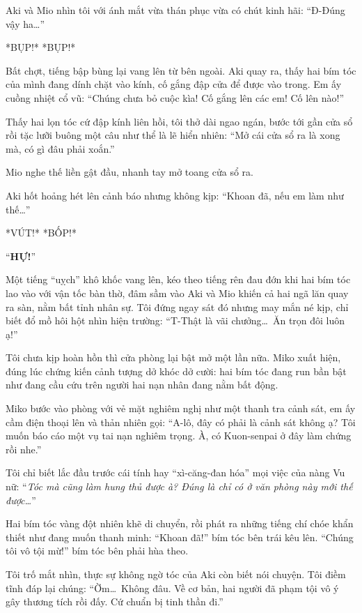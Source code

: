 \documentclass[../main.tex]{subfiles}
\begin{document}
Aki và Mio nhìn tôi với ánh mắt vừa thán phục vừa có chút kinh hãi: ``Đ-Đúng vậy ha\dots''

*BỤP!* *BỤP!*

Bất chợt, tiếng bập bùng lại vang lên từ bên ngoài. Aki quay ra, thấy hai bím tóc của mình đang dính chặt vào kính, cố gắng đập cửa để được vào trong. Em ấy cuồng nhiệt cổ vũ: ``Chúng chưa bỏ cuộc kìa! Cố gắng lên các em! Cố lên nào!''


Thấy hai lọn tóc cứ đập kính liên hồi, tôi thở dài ngao ngán, bước tới gần cửa sổ rồi tặc lưỡi buông một câu như thể là lẽ hiển nhiên: ``Mở cái cửa sổ ra là xong mà, có gì đâu phải xoắn.''

Mio nghe thế liền gật đầu, nhanh tay mở toang cửa sổ ra.

Aki hốt hoảng hét lên cảnh báo nhưng không kịp: ``Khoan đã, nếu em làm như thế\dots''

*VÚT!* *BỐP!*

``\textbf{HỰ!}''


Một tiếng ``uỵch'' khô khốc vang lên, kéo theo tiếng rên đau đớn khi hai bím tóc lao vào với vận tốc bàn thờ, đâm sầm vào Aki và Mio khiến cả hai ngã lăn quay ra sàn, nằm bất tỉnh nhân sự. Tôi đứng ngay sát đó nhưng may mắn né kịp, chỉ biết đổ mồ hôi hột nhìn hiện trường: ``T-Thật là vãi chưởng\dots\ Ăn trọn đôi luôn ạ!''

Tôi chưa kịp hoàn hồn thì cửa phòng lại bật mở một lần nữa. Miko xuất hiện, đúng lúc chứng kiến cảnh tượng dở khóc dở cười: hai bím tóc đang run bần bật như đang cầu cứu trên người hai nạn nhân đang nằm bất động.


Miko bước vào phòng với vẻ mặt nghiêm nghị như một thanh tra cảnh sát, em ấy cầm điện thoại lên và thản nhiên gọi: ``A-lô, đây có phải là cảnh sát không ạ? Tôi muốn báo cáo một vụ tai nạn nghiêm trọng. À, có Kuon-senpai ở đây làm chứng rồi nhe.''

Tôi chỉ biết lắc đầu trước cái tính hay ``xì-căng-đan hóa'' mọi việc của nàng Vu nữ: ``\textit{Tóc mà cũng làm hung thủ được à? Đúng là chỉ có ở văn phòng này mới thế được\dots}''

Hai bím tóc vàng đột nhiên khẽ di chuyển, rồi phát ra những tiếng chí chóe khẩn thiết như đang muốn thanh minh:
``Khoan đã!'' bím tóc bên trái kêu lên.
``Chúng tôi vô tội mừ!'' bím tóc bên phải hùa theo.

Tôi trố mắt nhìn, thực sự không ngờ tóc của Aki còn biết nói chuyện. Tôi điềm tĩnh đáp lại chúng: ``Ờm\dots\ Không đâu. Về cơ bản, hai người đã phạm tội vô ý gây thương tích rồi đấy. Cứ chuẩn bị tinh thần đi.''
\end{document}
